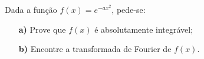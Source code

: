 \linespread{1.5}
Dada a função $f(x) = e^{-ax^2}$, pede-se:
\begin{itemize}
    \item[\textbf{a)}] Prove que $f(x)$ é absolutamente integrável;
    \item[\textbf{b)}]Encontre a transformada de Fourier de $f(x)$.
\end{itemize}
